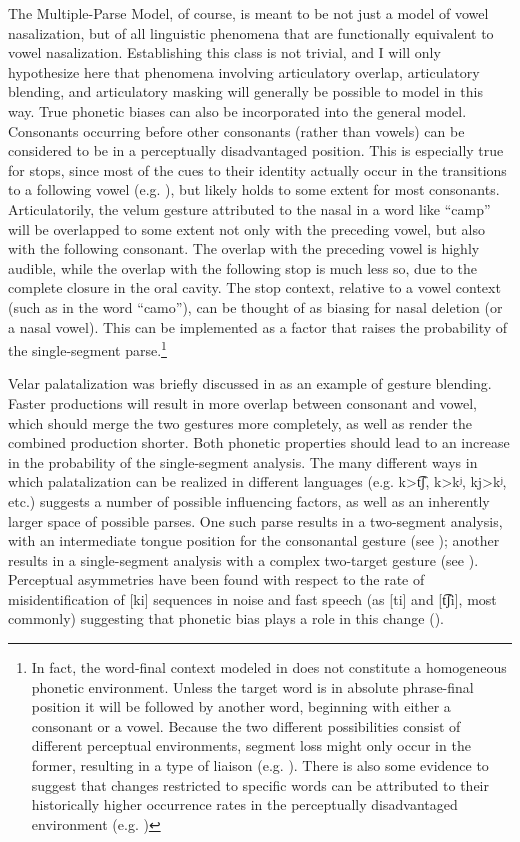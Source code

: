 The Multiple-Parse Model, of course, is meant to be not just a model
of vowel nasalization, but of all linguistic phenomena that are functionally
equivalent to vowel nasalization. Establishing this class is not trivial,
and I will only hypothesize here that phenomena involving articulatory
overlap, articulatory blending, and articulatory masking will generally
be possible to model in this way. True phonetic biases can also be
incorporated into the general model. Consonants occurring before other
consonants (rather than vowels) can be considered to be in a perceptually
disadvantaged position. This is especially true for stops, since most
of the cues to their identity actually occur in the transitions to
a following vowel (e.g. \citealt{liberman1954role}), but likely
holds to some extent for most consonants. Articulatorily, the velum
gesture attributed to the nasal in a word like “camp” will be
overlapped to some extent not only with the preceding vowel, but also
with the following consonant. The overlap with the preceding vowel
is highly audible, while the overlap with the following stop is much
less so, due to the complete closure in the oral cavity. The stop
context, relative to a vowel context (such as in the word “camo”),
can be thought of as biasing for nasal deletion (or a nasal vowel).
This can be implemented as a factor that raises the probability of
the single-segment parse.\footnote{In fact, the word-final context modeled in 
does not constitute a homogeneous phonetic environment. Unless the
target word is in absolute phrase-final position it will be followed
by another word, beginning with either a consonant or a vowel. Because
the two different possibilities consist of different perceptual environments,
segment loss might only occur in the former, resulting in a type of
liaison (e.g. \citealt{Tranel1981}). There is also some evidence
to suggest that changes restricted to specific words can be attributed
to their historically higher occurrence rates in the perceptually
disadvantaged environment (e.g. \citealt{brown2012discourse})}

Velar palatalization was briefly discussed in 
as an example of gesture blending. Faster productions will result
in more overlap between consonant and vowel, which should merge the
two gestures more completely, as well as render the combined production
shorter. Both phonetic properties should lead to an increase in the
probability of the single-segment analysis. The many different ways
in which palatalization can be realized in different languages (e.g.
{k\textgreater t͡ʃ}, {k\textgreater kʲ}, {kj\textgreater kʲ},
etc.) suggests a number of possible influencing factors, as well
as an inherently larger space of possible parses. One such parse results
in a two-segment analysis, with an intermediate tongue position for
the consonantal gesture (see ); another
results in a single-segment analysis with a complex two-target gesture
(see ). Perceptual asymmetries have
been found with respect to the rate of misidentification of {[}ki{]}
sequences in noise and fast speech (as {[}ti{]} and {[t͡ʃi]},
most commonly) suggesting that phonetic bias plays a role in this
change (\citealt{Guion1998,Chang2001}).

